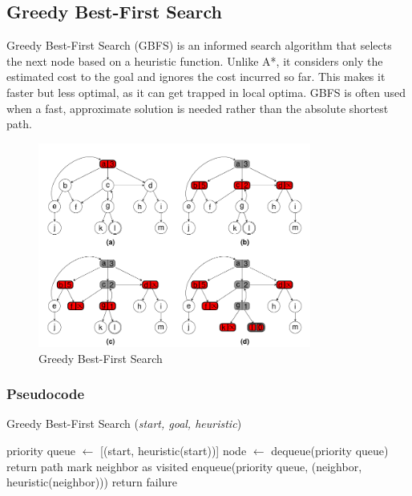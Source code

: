 \subsection{Greedy Best-First Search}
\noindent Greedy Best-First Search (GBFS) is an informed search algorithm that selects the next node based on a heuristic function. Unlike A*, it considers only the estimated cost to the goal and ignores the cost incurred so far. This makes it faster but less optimal, as it can get trapped in local optima. GBFS is often used when a fast, approximate solution is needed rather than the absolute shortest path.

\begin{figure}[H]
	\centering
	\includegraphics[width=0.8\textwidth]{./imgs/gbfs.png}
	\caption{Greedy Best-First Search}
	\label{fig:GBFS}
\end{figure}

\subsubsection{Pseudocode}
\begin{algorithm}[H]
	\caption{Greedy Best-First Search (\textit{start, goal, heuristic})}
	\label{alg:gbfs}
	\begin{algorithmic}[1]
		\State priority queue \(\gets\) [(start, heuristic(start))]
		\State node \(\gets\) dequeue(priority queue)
		\State return path
		\EndIf
		\State mark neighbor as visited
		\State enqueue(priority queue, (neighbor, heuristic(neighbor)))
		\EndIf
		\EndFor
		\EndWhile
		\State return failure
	\end{algorithmic}
\end{algorithm}

